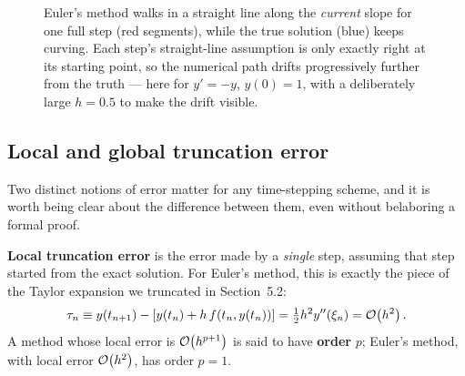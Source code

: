 \begin{figure}[h]
\centering
{}
\caption{Euler's method walks in a straight line along the \emph{current} slope for one full step (red segments), while the true solution (blue) keeps curving. Each step's straight-line assumption is only exactly right at its starting point, so the numerical path drifts progressively further from the truth --- here for $y'=-y$, $y(0)=1$, with a deliberately large $h=0.5$ to make the drift visible.}
\label{fig:euler-staircase}
\end{figure}

\subsection{Local and global truncation error}

Two distinct notions of error matter for any time-stepping scheme, and it is worth being clear about the difference between them, even without belaboring a formal proof.

\textbf{Local truncation error} is the error made by a \emph{single} step, assuming that step started from the exact solution. For Euler's method, this is exactly the piece of the Taylor expansion we truncated in Section~5.2:
\begin{equation}
\tau_n \equiv y(t_{n+1}) - \left[y(t_n) + h\,f(t_n, y(t_n))\right] = \tfrac{1}{2}h^2 y''(\xi_n) = \mathcal{O}\!\left(h^2\right).
\end{equation}
A method whose local error is $\mathcal{O}\!\left(h^{p+1}\right)$ is said to have \textbf{order} $p$; Euler's method, with local error $\mathcal{O}\!\left(h^2\right)$, has order $p=1$.

